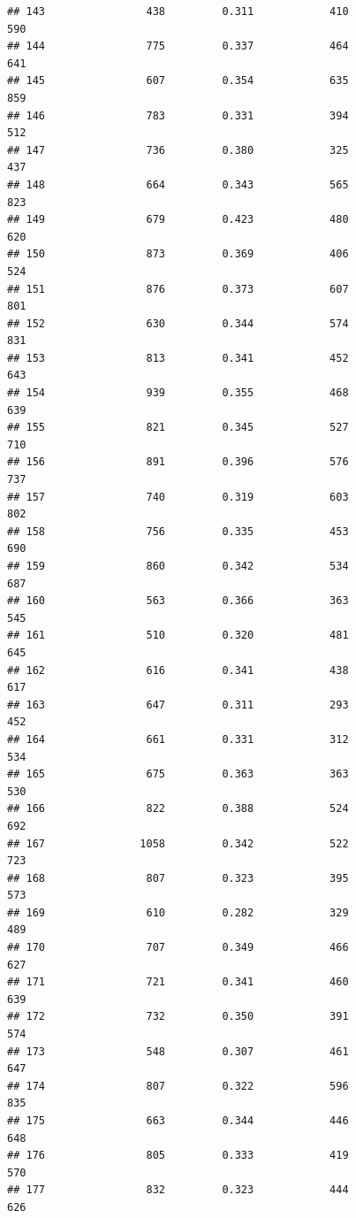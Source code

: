 \documentclass[]{book}
\begin{document}
\begin{verbatim}
## 143                438         0.311            410                 590
## 144                775         0.337            464                 641
## 145                607         0.354            635                 859
## 146                783         0.331            394                 512
## 147                736         0.380            325                 437
## 148                664         0.343            565                 823
## 149                679         0.423            480                 620
## 150                873         0.369            406                 524
## 151                876         0.373            607                 801
## 152                630         0.344            574                 831
## 153                813         0.341            452                 643
## 154                939         0.355            468                 639
## 155                821         0.345            527                 710
## 156                891         0.396            576                 737
## 157                740         0.319            603                 802
## 158                756         0.335            453                 690
## 159                860         0.342            534                 687
## 160                563         0.366            363                 545
## 161                510         0.320            481                 645
## 162                616         0.341            438                 617
## 163                647         0.311            293                 452
## 164                661         0.331            312                 534
## 165                675         0.363            363                 530
## 166                822         0.388            524                 692
## 167               1058         0.342            522                 723
## 168                807         0.323            395                 573
## 169                610         0.282            329                 489
## 170                707         0.349            466                 627
## 171                721         0.341            460                 639
## 172                732         0.350            391                 574
## 173                548         0.307            461                 647
## 174                807         0.322            596                 835
## 175                663         0.344            446                 648
## 176                805         0.333            419                 570
## 177                832         0.323            444                 626

\end{verbatim}
\end{document}
